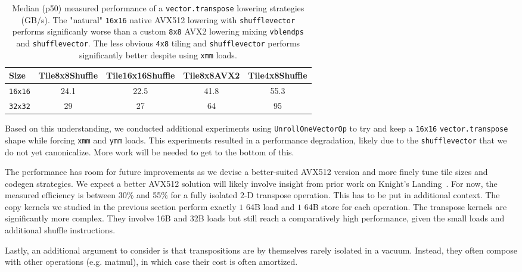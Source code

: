 \begin{table}[h!tb]
  \small
  \centering
  \begin{tabularx}{\textwidth}{X|cccc}
    \toprule
    \textbf{Size}     & \textbf{Tile8x8Shuffle}  & \textbf{Tile16x16Shuffle} & \textbf{Tile8x8AVX2} & \textbf{Tile4x8Shuffle}  \\
    \midrule
    \lstinline|16x16| &          24.1     &       22.5       &     41.8    &      55.3     \\
    \hline
    \lstinline|32x32| &          29       &       27         &     64      &      95       \\
    \bottomrule
  \end{tabularx}
  \smallskip
  \caption{Median (p50) measured performance of a \lstinline|vector.transpose| lowering strategies (GB/s).
   The "natural" \lstinline|16x16| native AVX512 lowering with \lstinline|shufflevector| performs significanly
   worse than a custom \lstinline|8x8| AVX2 lowering mixing \lstinline|vblendps| and \lstinline|shufflevector|.
   The less obvious \lstinline|4x8| tiling and \lstinline|shufflevector| performs significantly better despite
   using \lstinline|xmm| loads.}
  \label{tbl:comparison-transpose}
\end{table}

Based on this understanding, we conducted additional experiments using \lstinline|UnrollOneVectorOp| 
to try and keep a \lstinline|16x16| \lstinline|vector.transpose| shape while forcing \lstinline|xmm| and \lstinline|ymm| loads. 
This experiments resulted in a performance degradation, likely due to the \lstinline|shufflevector| that we do not yet canonicalize. 
More work will be needed to get to the bottom of  this. 

The performance has room for future improvements as we devise a better-suited AVX512 version and more finely tune tile sizes and codegen strategies.
We expect a better AVX512 solution will likely involve insight from prior work on Knight's Landing~\cite{IPDPS2013}.
For now, the measured efficiency is between 30\% and 55\% for a fully isolated $2$-D transpose operation.
This has to be put in additional context.
The copy kernels we studied in the previous section perform exactly $1$ 64B load and $1$ 64B store for each operation.
The transpose kernels are significantly more complex.
They involve 16B and 32B loads but still reach a comparatively high performance, given the small loads and additional shuffle instructions.

Lastly, an additional argument to consider is that transpositions are by themselves rarely isolated in a vacuum.
Instead, they often compose with other operations (e.g. matmul), in which case their cost is often amortized.

